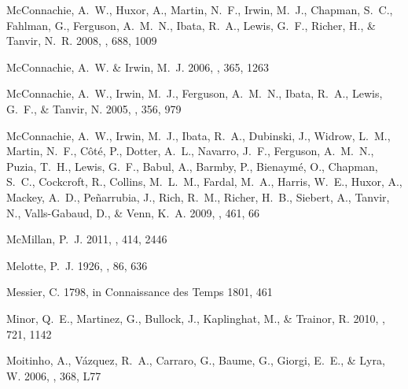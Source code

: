 \documentclass[manuscript]{aastex}
\begin{document}
\begin{thebibliography}{381}
{McConnachie}, A.~W., {Huxor}, A., {Martin}, N.~F., {Irwin}, M.~J., {Chapman},
  S.~C., {Fahlman}, G., {Ferguson}, A.~M.~N., {Ibata}, R.~A., {Lewis}, G.~F.,
  {Richer}, H., \& {Tanvir}, N.~R. 2008, \apj, 688, 1009

{McConnachie}, A.~W. \& {Irwin}, M.~J. 2006, \mnras, 365, 1263

{McConnachie}, A.~W., {Irwin}, M.~J., {Ferguson}, A.~M.~N., {Ibata}, R.~A.,
  {Lewis}, G.~F., \& {Tanvir}, N. 2005, \mnras, 356, 979

{McConnachie}, A.~W., {Irwin}, M.~J., {Ibata}, R.~A., {Dubinski}, J., {Widrow},
  L.~M., {Martin}, N.~F., {C{\^o}t{\'e}}, P., {Dotter}, A.~L., {Navarro},
  J.~F., {Ferguson}, A.~M.~N., {Puzia}, T.~H., {Lewis}, G.~F., {Babul}, A.,
  {Barmby}, P., {Bienaym{\'e}}, O., {Chapman}, S.~C., {Cockcroft}, R.,
  {Collins}, M.~L.~M., {Fardal}, M.~A., {Harris}, W.~E., {Huxor}, A., {Mackey},
  A.~D., {Pe{\~n}arrubia}, J., {Rich}, R.~M., {Richer}, H.~B., {Siebert}, A.,
  {Tanvir}, N., {Valls-Gabaud}, D., \& {Venn}, K.~A. 2009, \nat, 461, 66

{McMillan}, P.~J. 2011, \mnras, 414, 2446

{Melotte}, P.~J. 1926, \mnras, 86, 636

{Messier}, C. 1798, in Connaissance des Temps 1801, 461

{Minor}, Q.~E., {Martinez}, G., {Bullock}, J., {Kaplinghat}, M., \& {Trainor},
  R. 2010, \apj, 721, 1142

{Moitinho}, A., {V{\'a}zquez}, R.~A., {Carraro}, G., {Baume}, G., {Giorgi},
  E.~E., \& {Lyra}, W. 2006, \mnras, 368, L77


\end{thebibliography}
\end{document}
